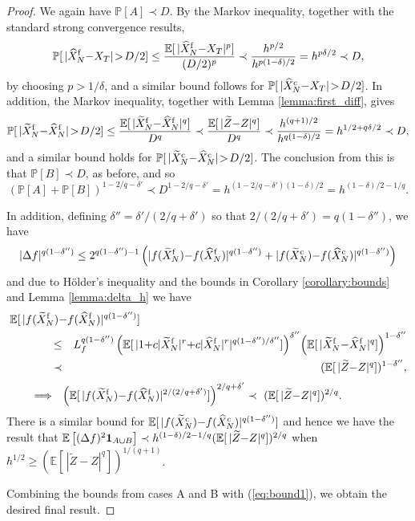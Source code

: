 \documentclass[review]{siamart190516}
\def \EE {{\mathbb{E}}}
\def \PP {{\mathbb{P}}}
\def \one {{\bf 1}}
\def \tZ {{\widetilde{Z}}}
\def \tXf  {{\widetilde{X}^{\rm f}}}
\def \tXc  {{\widetilde{X}^{\rm c}}}
\def \hXf {{\widehat{X}^{\rm f}}}
\def \hXc {{\widehat{X}^{\rm c}}}
\begin{document}
\begin{proof}
We again have $\PP[A] \prec D$.  By the Markov inequality,
together with the standard strong convergence results,
\[
\PP[\, |\hXf_N {-} X_T| \!>\! D/2] 
\leq \frac{\EE[\, |\hXf_N {-} X_T|^p]}{(D/2)^p}
\prec \frac{h^{p/2}}{h^{p(1-\delta)/2}}
= h^{p\delta/2}
\prec D,
\]
by choosing $p\!>\!1/\delta$, and a similar bound follows for
$\PP[\, |\hXc_N {-} X_T| \!>\! D/2]$.
In addition, the Markov inequality, together with Lemma \ref{lemma:first_diff}, gives
\[
\PP[\, |\tXf_N {-} \hXf_N| \!>\! D/2] 
\leq \frac{\EE[\, |\tXf_N {-} \hXf_N|^q]}{D^q}
\prec \frac{\EE[\, |\tZ{-}Z|^q]}{D^q} 
\prec \frac{h^{(q+1)/2}}{h^{q(1-\delta)/2}}
= h^{1/2+q\delta/2}
\prec D,
\]
and a similar bound holds for $\PP[\, |\tXc_N {-} \hXc_N| \!>\! D/2]$.
The conclusion from this is that $\PP[B]\prec D$, as before, and so
\[
\left( \PP[A] + \PP[B] \right)^{1-2/q-\delta'}
\prec D^{1-2/q-\delta'}
=  h^{(1-2/q-\delta')(1-\delta)/2}
= h^{(1-\delta)/2 - 1/q}.
\]

In addition, defining $\delta''=\delta'/(2/q{+}\delta')$ so that
$2/(2/q+\delta')=q(1{-}\delta'')$, we have
\[
|\Delta f|^{q(1{-}\delta'')} \leq 2^{q(1{-}\delta'')-1}\left(
  |f(\tXf_N) {-} f(\hXf_N)|^{q(1{-}\delta'')} + |f(\tXc_N) {-} f(\hXc_N)|^{q(1{-}\delta'')}
  \right)
\]
and due to H\"older's inequality and the bounds in Corollary \ref{corollary:bounds}
and Lemma \ref{lemma:delta_h} we have
\begin{eqnarray*}
\lefteqn{\hspace*{-0.5in}
\EE[\, |f(\tXf_N) {-} f(\hXf_N)|^{q(1-\delta'')}]
}
\\ \hspace*{0.5in}
  &\leq& L_f^{q(1-\delta'')} \left( \EE[\, |1 {+} c |\tXf_N|^r {+} c |\hXf_N|^r|^{q(1-\delta'')/\delta''}]\right)^{\delta''}
  \!     \left( \EE[\, |\tXf_N {-} \hXf_N|^q]\right)^{1-\delta''}
\\ &\prec&  (\EE[\, |\tZ{-}Z|^q])^{1-\delta''},
\end{eqnarray*}
\[
\hspace*{-0.5in}  
\Longrightarrow ~~ \left( \EE[\,|f(\tXf_N) {-} f(\hXf_N)|^{2/(2/q+\delta')}] \right)^{2/q+\delta'}
\prec\ (\EE[\, |\tZ{-}Z|^q])^{2/q}.
\]
There is a similar bound for $\EE[\, |f(\tXc_N) {-} f(\hXc_N)|^{q(1-\delta'')}]$
and hence we have the result that 
$\EE\left[ (\Delta f)^2 \one_{A\cup B} \right]
\prec h^{(1-\delta)/2-1/q} (\EE[\, |\tZ{-}Z|^q])^{2/q}$
when $h^{1/2} \geq (\EE[\, |\tZ{-}Z|^q])^{1/(q+1)}$.

Combining the bounds from cases A and B with (\ref{eq:bound1}),
we obtain the desired final result.
\end{proof}
\end{document}

